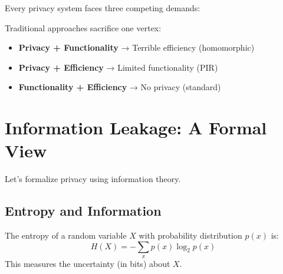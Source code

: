 Every privacy system faces three competing demands:

\begin{center}
\end{center}

Traditional approaches sacrifice one vertex:
\begin{itemize}
\item \textbf{Privacy + Functionality} → Terrible efficiency (homomorphic)
\item \textbf{Privacy + Efficiency} → Limited functionality (PIR)  
\item \textbf{Functionality + Efficiency} → No privacy (standard)
\end{itemize}

\section{Information Leakage: A Formal View}

Let's formalize privacy using information theory.

\subsection{Entropy and Information}

\begin{definition}[Entropy]
The entropy of a random variable $X$ with probability distribution $p(x)$ is:
$$H(X) = -\sum_{x} p(x) \log_2 p(x)$$
This measures the uncertainty (in bits) about $X$.
\end{definition}

